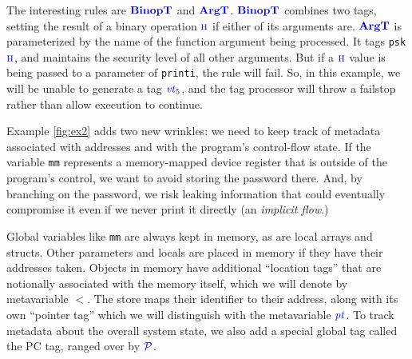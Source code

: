 \documentclass{llncs}
\begin{document}
The interesting rules are \(\color{blue} \mathbf{BinopT}\) and \(\color{blue} \mathbf{ArgT}\). \(\color{blue} \mathbf{BinopT}\)
combines two tags, setting the result of a binary operation \(\textnormal{\color{blue} \sc h}\) if either of its arguments are.
\(\color{blue} \mathbf{ArgT}\) is parameterized by the name of the function argument being processed.
It tags {\tt psk} \(\textnormal{\color{blue} \sc h}\), and maintains the security level of all other arguments.
But if a \(\textnormal{\color{blue} \sc h}\) value is being passed to a parameter of {\tt printi}, the rule will fail.
So, in this example, we will be unable to generate a tag
\(\mathit{\color{blue} vt}_5\), and the tag processor will throw a failstop rather than allow execution to continue.

Example \ref{fig:ex2} adds two new wrinkles: we need to keep track of metadata associated with
addresses and with the program's control-flow state. If the variable {\tt mm} represents
a memory-mapped device register that is outside of the program's control, we want to avoid storing the password there. And, by
branching on the password, we risk leaking information that could eventually compromise it even
if we never print it directly (an {\em implicit flow}.)

Global variables like {\tt mm} are always kept in memory, as are local arrays and structs.
Other parameters and locals are placed in memory if they have their addresses taken.
Objects in memory have additional ``location tags'' that are notionally associated with the memory
itself, which we will denote by metavariable \(\lt\). The store maps their identifier
to their address, along with its own ``pointer tag'' which we will distinguish with the
metavariable \(\mathit{\color{blue} pt}\). To track metadata about the overall system state, we also add
a special global tag called the PC tag, ranged over by \(\mathcal{\color{blue} P}\).
\end{document}
